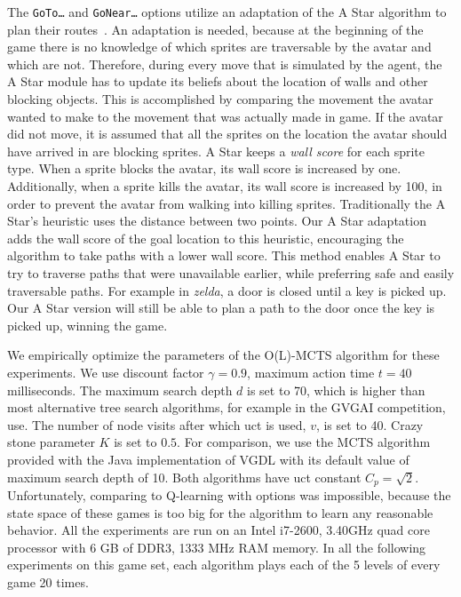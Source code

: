 The \texttt{GoTo\ldots} and \texttt{GoNear\ldots} options utilize an adaptation
of the A Star algorithm to plan their routes~\cite{hart1968formal}. An
adaptation is needed, because at the beginning of the game there is no knowledge
of which sprites are traversable by the avatar and which are not. Therefore,
during every move that is simulated by the agent, the A Star module has to
update its beliefs about the location of walls and other blocking objects. This
is accomplished by comparing the movement the avatar wanted to make to the
movement that was actually made in game. If the avatar did not move, it is
assumed that all the sprites on the location the avatar should have arrived in
are blocking sprites. A Star keeps a \emph{wall score} for each sprite type.
When a sprite blocks the avatar, its wall score is increased by one.
Additionally, when a sprite kills the avatar, its wall score is increased by
100, in order to prevent the avatar from walking into killing sprites.
Traditionally the A Star's heuristic uses the distance between two points. Our A
Star adaptation adds the wall score of the goal location to this heuristic,
encouraging the algorithm to take paths with a lower wall score. This method
enables A Star to try to traverse paths that were unavailable earlier, while
preferring safe and easily traversable paths. For example in \textit{zelda}, a
door is closed until a key is picked up. Our A Star version will still be able
to plan a path to the door once the key is picked up, winning the game.

We empirically optimize the parameters of the O(L)-MCTS algorithm
for these experiments. We use discount factor $\gamma = 0.9$, maximum action
time $t = 40$ milliseconds. The maximum search depth $d$ is set to 70, which is
higher than most alternative tree search algorithms, for example in the GVGAI
competition, use. The number of node visits after which \textsf{uct} is used,
$v$, is set to 40. Crazy stone parameter $K$ is set to $0.5$.  For comparison,
we use the MCTS algorithm provided with the Java implementation of VGDL with its
default value of maximum search depth of 10. Both algorithms have \textsf{uct}
constant $C_p = \sqrt{2}$. Unfortunately, comparing to Q-learning with options
was impossible, because the state space of these games is too big for the
algorithm to learn any reasonable behavior. All the experiments are run on an
Intel i7-2600, 3.40GHz quad core processor with 6 GB of DDR3, 1333 MHz RAM
memory. In all the following experiments on this game set, each algorithm plays
each of the 5 levels of every game 20 times. 

